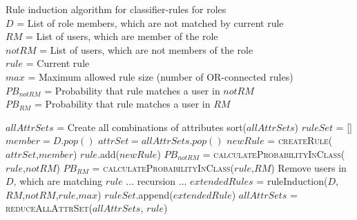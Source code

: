         \begin{algorithm}
            \caption{Rule induction algorithm for classifier-rules for roles\\
            $D$ = List of role members, which are not matched by current rule\\
            $RM$ = List of users, which are member of the role\\
            $notRM$ = List of users, which are not members of the role\\
            $rule$ = Current rule\\
            $max$ = Maximum allowed rule size (number of OR-connected rules)\\
            $PB_{notRM}$ = Probability that rule matches a user in $notRM$\\
            $PB_{RM}$ = Probability that rule matches a user in $RM$}
            \label{alg:ruleInduction}
            \begin{algorithmic}[1]
                    \State $allAttrSets$ = Create all combinations of attributes
                    \State sort($allAttrSets$)
                    \State $ruleSet$ = []
                        \State $member = D.pop()$
                            \State $attrSet = allAttrSets.pop()$
                            \State $newRule$ = \textsc{createRule}($attrSet$,$member$)
                            \State $rule$.add($newRule$)
                            \State $PB_{notRM}$ = \textsc{calculateProbabilityInClass}($rule$,$notRM$)
                                \State $PB_{RM}$ = \textsc{calculateProbabilityInClass}($rule$,$RM$)
                                \State Remove users in $D$, which are matching $rule$
                                        \State ... recursion ...
                                        \iffalse
                                        \State $extendedRules$ = ruleInduction($D$,$RM$,$notRM$,$rule$,$max$)
                                            \State $ruleSet$.append($extendedRule$)
                                                \State $allAttrSets$ = \textsc{reduceAllAttrSet}($allAttrSets$, $rule$)

\end{algorithmic}
\end{algorithm}
